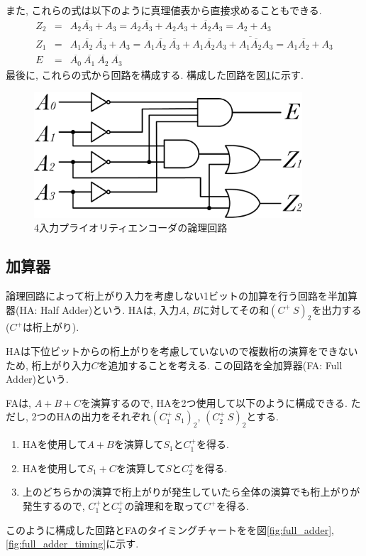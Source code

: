 \documentclass[titlepage]{jsarticle}
\begin{document}
    また, これらの式は以下のように真理値表から直接求めることもできる.
    \begin{eqnarray*}
      Z_2 &=& A_2 \overline{A_3} + A_3 =
        A_2 \overline{A_3} + A_2A_3 + \overline{A_2}A_3 =
        A_2 + A_3 \\
      Z_1 &=& A_1 \overline{A_2} \ \overline{A_3} + A_3 =
        A_1 \overline{A_2} \ \overline{A_3} + A_1 \overline{A_2}A_3 +
          \overline{A_1 \overline{A_2}} A_3 =
        A_1 \overline{A_2} + A_3 \\
      E &=& \overline{A_0} \ \overline{A_1} \ \overline{A_2} \ \overline{A_3}
    \end{eqnarray*}
    最後に, これらの式から回路を構成する.
    構成した回路を図\ref{fig:priority_encoder}に示す.
    \begin{figure}[h]
      \centering
      \includegraphics[width=10cm]{images/priority.pdf}
      \caption{4入力プライオリティエンコーダの論理回路}
      \label{fig:priority_encoder}
    \end{figure}
  \subsection{加算器} \label{subsec:FA}
    論理回路によって桁上がり入力を考慮しない1ビットの加算を行う回路を半加算器(HA: Half Adder)という.
    HAは, 入力$A$, $B$に対してその和$(C^+ \ S)_2$を出力する($C^+$は桁上がり).

    HAは下位ビットからの桁上がりを考慮していないので複数桁の演算をできないため,
    桁上がり入力$C$を追加することを考える.
    この回路を全加算器(FA: Full Adder)という.

    FAは, $A + B + C$を演算するので, HAを2つ使用して以下のように構成できる.
    ただし, 2つのHAの出力をそれぞれ$(C_1^+ \ S_1)_2$, $(C_2^+ \ S)_2$とする.
    \begin{enumerate}
      \item HAを使用して$A + B$を演算して$S_1$と$C_1^+$を得る.
      \item HAを使用して$S_1 + C$を演算して$S$と$C_2^+$を得る.
      \item 上のどちらかの演算で桁上がりが発生していたら全体の演算でも桁上がりが発生するので,
        $C_1^+$と$C_2^+$の論理和を取って$C^+$を得る.
    \end{enumerate}
    このように構成した回路とFAのタイミングチャートをを図\ref{fig:full_adder},
    \ref{fig:full_adder_timing}に示す.
\end{document}
